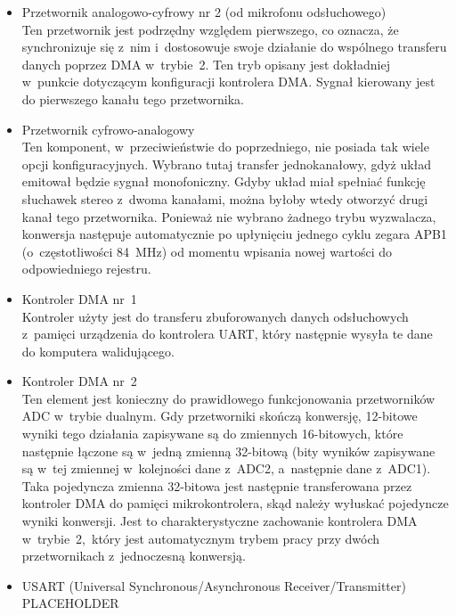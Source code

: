 \begin{itemize}
\begin{center}
\end{center}
	W~związku z~tym, przetwornik w~takiej konfiguracji będzie mógł efektywnie konwertować sygnały o~maksymalnej częstotliwości równej \SI{3811}{\Hz}. Należy jednak wziąć pod uwagę czas, jaki zajmą obliczenia generujące sygnał przeciwstawny, częstotliwość wzbudzeń pochodzących od timera oraz czas konwersji DAC. Wszystkie te oraz inne czynniki składają się na zmniejszenie efektywnej zdolności przetwarzania układu. Autor po opisaniu wszystkich parametrów konfiguracyjnych oraz zaimplementowaniu i~przetestowaniu programu przedstawi maksymalną częstotliwość, jaką układ jest w~stanie przetwarzać.
	\item Przetwornik analogowo-cyfrowy nr 2 (od mikrofonu odsłuchowego)\\
	Ten przetwornik jest podrzędny względem pierwszego, co oznacza, że synchronizuje się z~nim i~dostosowuje swoje działanie do wspólnego transferu danych poprzez DMA w~trybie~2. Ten tryb opisany jest dokładniej w~punkcie dotyczącym konfiguracji kontrolera DMA. Sygnał kierowany jest do pierwszego kanału tego przetwornika.
	\item Przetwornik cyfrowo-analogowy\\
	Ten komponent, w~przeciwieństwie do poprzedniego, nie posiada tak wiele opcji konfiguracyjnych. Wybrano tutaj transfer jednokanałowy, gdyż układ emitował będzie sygnał monofoniczny. Gdyby układ miał spełniać funkcję słuchawek stereo z~dwoma kanałami, można byłoby wtedy otworzyć drugi kanał tego przetwornika. Ponieważ nie wybrano żadnego trybu wyzwalacza, konwersja następuje automatycznie po upłynięciu jednego cyklu zegara APB1 (o~częstotliwości \SI{84}{\MHz}) od momentu wpisania nowej wartości do odpowiedniego rejestru.
	\item Kontroler DMA nr~1\\
	Kontroler użyty jest do transferu zbuforowanych danych odsłuchowych z~pamięci urządzenia do kontrolera UART, który następnie wysyła te dane do komputera walidującego.
	\item Kontroler DMA nr~2\\
	Ten element jest konieczny do prawidłowego funkcjonowania przetworników ADC w~trybie dualnym. Gdy przetworniki skończą konwersję, 12-bitowe wyniki tego działania zapisywane są do zmiennych 16-bitowych, które następnie łączone są w~jedną zmienną 32-bitową (bity wyników zapisywane są w~tej zmiennej w~kolejności dane z~ADC2, a~następnie dane z~ADC1). Taka pojedyncza zmienna 32-bitowa jest następnie transferowana przez kontroler DMA do pamięci mikrokontrolera, skąd należy wyłuskać pojedyncze wyniki konwersji. Jest to charakterystyczne zachowanie kontrolera DMA w~trybie~2,~który jest automatycznym trybem pracy przy dwóch przetwornikach z~jednoczesną konwersją.
	\item USART (Universal Synchronous/Asynchronous Receiver/Transmitter)\\
	PLACEHOLDER
\end{itemize}
